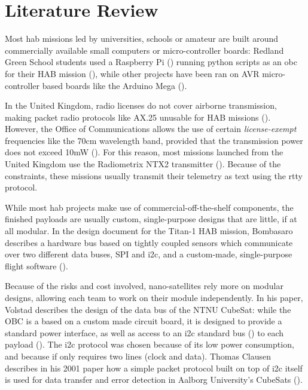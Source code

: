 \chapter{Literature Review}
\label{ch:literature-review}

Most \acrshort{hab} missions led by universities, schools or amateur are built 
around commercially available small computers or micro-controller boards:
Redland Green School students used a Raspberry Pi (\cite{rpi2014}) running
python scripts as an \acrfull{obc} for their HAB mission
(\cite{Hinschelwood2015}), while other projects have been ran on AVR
micro-controller based boards like the Arduino Mega
(\cite{AtmelCorporation2015}).

In the United Kingdom, radio licenses do not cover airborne transmission, making
packet radio protocols like AX.25 unusable for HAB missions 
(\cite{ukhasradio2016}). However, the Office of Communications allows the use
of certain \textit{license-exempt} frequencies like the 70cm wavelength band,
provided that the transmission power does not exceed 10mW (\cite{Ofcom2014}).
For this reason, most missions launched from the United Kingdom use the
Radiometrix NTX2 transmitter (\cite{radiometrix2012}). Because of the
constraints, these missions usually transmit their telemetry as text using the
\acrfull{rtty} protocol.

While most \acrshort{hab} projects make use of commercial-off-the-shelf
components, the finished payloads are usually custom, single-purpose designs
that are little, if at all modular. In the design document for the Titan-1 HAB
mission, Bombasaro describes a hardware bus based on tightly coupled sensors
which communicate over two different data buses, SPI and \acrshort{i2c}, and a
custom-made, single-purpose flight software (\cite{Bombasaro2015}).

Because of the risks and cost involved, nano-satellites rely more on modular
designs, allowing each team to work on their module independently. In his paper,
Volstad describes the design of the data bus of the NTNU CubeSat: while the OBC
is a based on a custom made circuit board, it is designed to provide a standard
power interface, as well as access to an \acrshort{i2c} standard bus
(\cite{NXPSemiconductors2014}) to each payload (\cite{Volstad2011}). The
\acrshort{i2c} protocol was chosen because of its low power consumption, and
because if only requires two lines (clock and data). Thomas Clausen describes
in his 2001 paper how a simple packet protocol built on top of \acrshort{i2c}
itself is used for data transfer and error detection in Aalborg University's
CubeSats (\cite{Clausen2001}).

